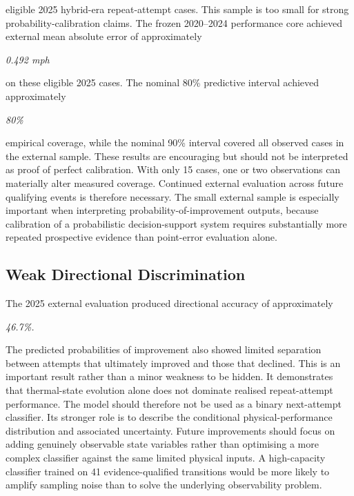 eligible 2025 hybrid-era repeat-attempt cases. This sample is too small for strong probability-calibration claims. The frozen 2020--2024 performance core achieved external mean absolute error of approximately

\begin{center}\textit{0.492 mph}\end{center}

on these eligible 2025 cases. The nominal 80\% predictive interval achieved approximately

\begin{center}\textit{80\%}\end{center}

empirical coverage, while the nominal 90\% interval covered all observed cases in the external sample. These results are encouraging but should not be interpreted as proof of perfect calibration. With only 15 cases, one or two observations can materially alter measured coverage. Continued external evaluation across future qualifying events is therefore necessary. The small external sample is especially important when interpreting probability-of-improvement outputs, because calibration of a probabilistic decision-support system requires substantially more repeated prospective evidence than point-error evaluation alone.

\subsection{Weak Directional Discrimination}
The 2025 external evaluation produced directional accuracy of approximately

\begin{center}\textit{46.7\%.}\end{center}

The predicted probabilities of improvement also showed limited separation between attempts that ultimately improved and those that declined. This is an important result rather than a minor weakness to be hidden. It demonstrates that thermal-state evolution alone does not dominate realised repeat-attempt performance. The model should therefore not be used as a binary next-attempt classifier. Its stronger role is to describe the conditional physical-performance distribution and associated uncertainty. Future improvements should focus on adding genuinely observable state variables rather than optimising a more complex classifier against the same limited physical inputs. A high-capacity classifier trained on 41 evidence-qualified transitions would be more likely to amplify sampling noise than to solve the underlying observability problem.

